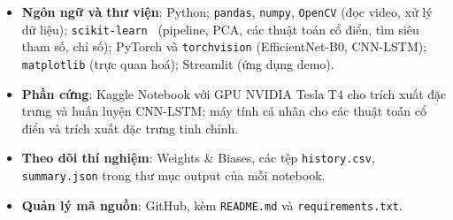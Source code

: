 \begin{itemize}
  \item \textbf{Ngôn ngữ và thư viện}: Python; \texttt{pandas}, \texttt{numpy}, \texttt{OpenCV} (đọc video, xử lý dữ liệu); \texttt{scikit-learn}~\cite{sklearn} (pipeline, PCA, các thuật toán cổ điển, tìm siêu tham số, chỉ số); PyTorch và \texttt{torchvision} (EfficientNet-B0, CNN-LSTM); \texttt{matplotlib} (trực quan hoá); Streamlit (ứng dụng demo).
  \item \textbf{Phần cứng}: Kaggle Notebook với GPU NVIDIA Tesla T4 cho trích xuất đặc trưng và huấn luyện CNN-LSTM; máy tính cá nhân cho các thuật toán cổ điển và trích xuất đặc trưng tinh chỉnh.
  \item \textbf{Theo dõi thí nghiệm}: Weights \& Biases, các tệp \texttt{history.csv}, \texttt{summary.json} trong thư mục output của mỗi notebook.
  \item \textbf{Quản lý mã nguồn}: GitHub, kèm \texttt{README.md} và \texttt{requirements.txt}.
\end{itemize}
